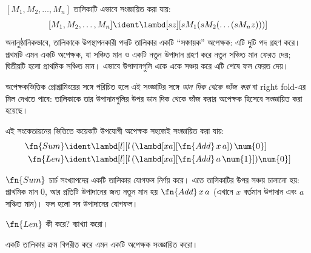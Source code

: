 \documentclass[../../../include/open-logic-section]{subfiles}
\begin{document}

$[M_1, M_2, \ldots, M_n]$ তালিকাটি এভাবে সংজ্ঞায়িত করা যায়:
\[
  [M_1, M_2, \ldots, M_n] \ident \lambd[sz][s M_1 (s M_2 (\ldots (s M_n z)))]
\]
অনানুষ্ঠানিকভাবে, তালিকাকে উপস্থাপনকারী পদটি তালিকার একটি
``সঞ্চায়ক'' অপেক্ষক: এটি দুটি পদ গ্রহণ করে। প্রথমটি এমন একটি অপেক্ষক,
যা সঞ্চিত মান ও একটি নতুন উপাদান গ্রহণ করে নতুন সঞ্চিত মান ফেরত দেয়;
দ্বিতীয়টি হলো প্রাথমিক সঞ্চিত মান। এভাবে উপাদানগুলি একে একে সঞ্চয়
করে এটি শেষে ফল ফেরত দেয়।

\begin{digress}
  অপেক্ষকভিত্তিক প্রোগ্রামিংয়ের সঙ্গে পরিচিত হলে এই সংজ্ঞাটির সঙ্গে
  \emph{ডান দিক থেকে ভাঁজ করা} বা right fold-এর মিল দেখতে পাবে:
  তালিকাকে তার উপাদানগুলির উপর ডান দিক থেকে ভাঁজ করার অপেক্ষক হিসেবে
  সংজ্ঞায়িত করা হয়েছে।
\end{digress}

এই সংকেতায়নের ভিত্তিতে কয়েকটি উপযোগী অপেক্ষক সহজেই সংজ্ঞায়িত করা যায়:
\begin{align*}
  \fn{Sum} & \ident
  \lambd[l][l \, (\lambd[xa][\fn{Add} \, x \, a])\,  \num{0}]\\
  \fn{Len} & \ident
  \lambd[l][l \, (\lambd[xa][\fn{Add} \, a \, \num{1}]) \num{0}]
\end{align*}

$\fn{Sum}$ চার্চ সংখ্যাপদের একটি তালিকার যোগফল নির্ণয় করে। এতে
তালিকাটির উপর সঞ্চয় চালানো হয়: প্রাথমিক মান $\num{0}$, আর প্রতিটি
উপাদানের জন্য নতুন মান হয় $\fn{Add} \, x\, a$ (এখানে $x$ বর্তমান
উপাদান এবং $a$ সঞ্চিত মান)। ফল হলো সব উপাদানের যোগফল।

\begin{prob}
  $\fn{Len}$ কী করে? ব্যাখ্যা করো।
\end{prob}

\begin{prob}
  একটি তালিকার ক্রম বিপরীত করে এমন একটি অপেক্ষক সংজ্ঞায়িত করো।
\end{prob}
\end{document}
